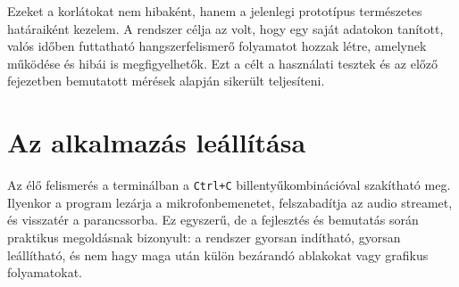 Ezeket a korlátokat nem hibaként, hanem a jelenlegi prototípus természetes határaiként kezelem. A rendszer célja az volt, hogy egy saját adatokon tanított, valós időben futtatható hangszerfelismerő folyamatot hozzak létre, amelynek működése és hibái is megfigyelhetők. Ezt a célt a használati tesztek és az előző fejezetben bemutatott mérések alapján sikerült teljesíteni.

\section{Az alkalmazás leállítása}
\label{sec:alkalmazas_leallitasa}

Az élő felismerés a terminálban a \texttt{Ctrl+C} billentyűkombinációval szakítható meg. Ilyenkor a program lezárja a mikrofonbemenetet, felszabadítja az audio streamet, és visszatér a parancssorba. Ez egyszerű, de a fejlesztés és bemutatás során praktikus megoldásnak bizonyult: a rendszer gyorsan indítható, gyorsan leállítható, és nem hagy maga után külön bezárandó ablakokat vagy grafikus folyamatokat.
